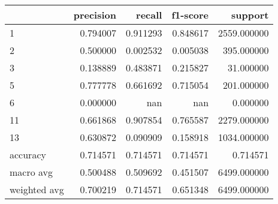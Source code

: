 \begin{tabular}{lrrrr}
\toprule
 & precision & recall & f1-score & support \\
\midrule
1 & 0.794007 & 0.911293 & 0.848617 & 2559.000000 \\
2 & 0.500000 & 0.002532 & 0.005038 & 395.000000 \\
3 & 0.138889 & 0.483871 & 0.215827 & 31.000000 \\
5 & 0.777778 & 0.661692 & 0.715054 & 201.000000 \\
6 & 0.000000 & nan & nan & 0.000000 \\
11 & 0.661868 & 0.907854 & 0.765587 & 2279.000000 \\
13 & 0.630872 & 0.090909 & 0.158918 & 1034.000000 \\
accuracy & 0.714571 & 0.714571 & 0.714571 & 0.714571 \\
macro avg & 0.500488 & 0.509692 & 0.451507 & 6499.000000 \\
weighted avg & 0.700219 & 0.714571 & 0.651348 & 6499.000000 \\
\bottomrule
\end{tabular}
